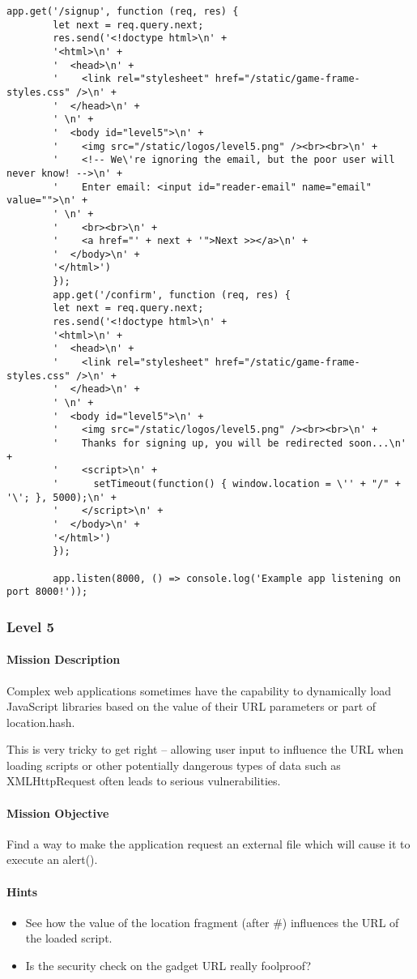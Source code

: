 \begin{Exercise}[label={websec-xss-game}]
\begin{lstlisting}[style=JavaScript]
		app.get('/signup', function (req, res) {
		let next = req.query.next;
		res.send('<!doctype html>\n' +
		'<html>\n' +
		'  <head>\n' +
		'    <link rel="stylesheet" href="/static/game-frame-styles.css" />\n' +
		'  </head>\n' +
		' \n' +
		'  <body id="level5">\n' +
		'    <img src="/static/logos/level5.png" /><br><br>\n' +
		'    <!-- We\'re ignoring the email, but the poor user will never know! -->\n' +
		'    Enter email: <input id="reader-email" name="email" value="">\n' +
		' \n' +
		'    <br><br>\n' +
		'    <a href="' + next + '">Next >></a>\n' +
		'  </body>\n' +
		'</html>')
		});
		app.get('/confirm', function (req, res) {
		let next = req.query.next;
		res.send('<!doctype html>\n' +
		'<html>\n' +
		'  <head>\n' +
		'    <link rel="stylesheet" href="/static/game-frame-styles.css" />\n' +
		'  </head>\n' +
		' \n' +
		'  <body id="level5">\n' +
		'    <img src="/static/logos/level5.png" /><br><br>\n' +
		'    Thanks for signing up, you will be redirected soon...\n' +
		'    <script>\n' +
		'      setTimeout(function() { window.location = \'' + "/" + '\'; }, 5000);\n' +
		'    </script>\n' +
		'  </body>\n' +
		'</html>')
		});
		
		app.listen(8000, () => console.log('Example app listening on port 8000!'));
		\end{lstlisting}
	\subsubsection{Level 5}
		\paragraph{Mission Description}
		Complex web applications sometimes have the capability to dynamically load JavaScript libraries based on the value of their URL parameters or part of location.hash. 
		
		This is very tricky to get right -- allowing user input to influence the URL when loading scripts or other potentially dangerous types of data such as XMLHttpRequest often leads to serious vulnerabilities.
		
		
		\paragraph{Mission Objective}
		Find a way to make the application request an external file which will cause it to execute an alert(). 
		
		\paragraph{Hints}
		\begin{itemize}
		\item See how the value of the location fragment (after #) influences the URL of the loaded script.
		\item Is the security check on the gadget URL really foolproof?
		\end{itemize}

\end{Exercise}
